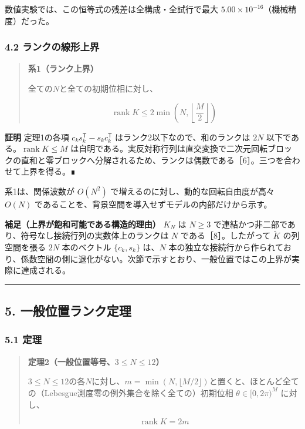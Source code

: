 \documentclass[
  a4paper,
]{ltjsarticle}
\begin{document}
数値実験では、この恒等式の残差は全構成・全試行で最大
\(5.00\times10^{-16}\)（機械精度）だった。

\subsubsection{4.2
ランクの線形上界}\label{ux30e9ux30f3ux30afux306eux7ddaux5f62ux4e0aux754c}

\begin{quote}
\textbf{系1（ランク上界）}

全ての\(N\)と全ての初期位相に対し、

\[
\operatorname{rank}K
\le
2\min\!\left(N,\left\lfloor\frac{M}{2}\right\rfloor\right)
\]
\end{quote}

\textbf{証明} 定理1の各項 \(c_ks_k^{\mathsf T}-s_kc_k^{\mathsf T}\)
はランク2以下なので、和のランクは \(2N\)
以下である。\(\operatorname{rank}K\le M\)
は自明である。実反対称行列は直交変換で二次元回転ブロックの直和と零ブロックへ分解されるため、ランクは偶数である［6］。三つを合わせて上界を得る。∎

系1は、関係波数が \(O(N^2)\) で増えるのに対し、動的な回転自由度が高々
\(O(N)\) であることを、背景空間を導入せずモデルの内部だけから示す。

\textbf{補足（上界が飽和可能である構造的理由）} \(K_N\) は \(N\ge3\)
で連結かつ非二部であり、符号なし接続行列の実数体上のランクは \(N\)
である［8］。したがって \(\widetilde K\) の列空間を張る \(2N\)
本のベクトル \(\{c_k,s_k\}\) は、\(N\)
本の独立な接続行から作られており、係数空間の側に退化がない。次節で示すとおり、一般位置ではこの上界が実際に達成される。

\begin{center}\rule{0.5\linewidth}{0.5pt}\end{center}

\subsection{5.
一般位置ランク定理}\label{ux4e00ux822cux4f4dux7f6eux30e9ux30f3ux30afux5b9aux7406}

\subsubsection{5.1 定理}\label{ux5b9aux7406-1}

\begin{quote}
\textbf{定理2（一般位置等号、\(3\le N\le12\)）}

\(3\le N\le12\)の各\(N\)に対し、\(m=\min(N,\lfloor M/2\rfloor)\)と置くと、ほとんど全ての（Lebesgue測度零の例外集合を除く全ての）初期位相
\(\theta\in[0,2\pi)^M\) に対し、

\[
\operatorname{rank}K=2m
\]
\end{quote}
\end{document}
